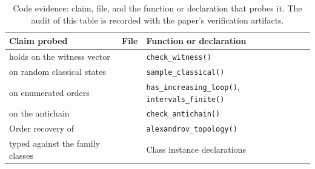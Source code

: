 \documentclass[11pt,letterpaper]{article}
\theoremstyle{definition}
\theoremstyle{remark}
\begin{document}
\begin{table}[t]
\centering
\caption{Code evidence: claim, file, and the function or declaration that probes it. The audit of this table is recorded with the paper's verification artifacts.}
\label{tab:code}
\footnotesize
\begin{tabularx}{\textwidth}{L{0.32\textwidth}L{0.28\textwidth}X}
\toprule
Claim probed & File & Function or declaration \\
\midrule
{} holds on the witness vector &  & \texttt{check\_witness()} \\
 on random classical states &  & \texttt{sample\_classical()} \\
 on enumerated orders &  & \texttt{has\_increasing\_loop()}, \texttt{intervals\_finite()} \\
 on the antichain &  & \texttt{check\_antichain()} \\
Order recovery of  &  & \texttt{alexandrov\_topology()} \\
 typed against the family classes &  & Class instance declarations \\
\bottomrule
\end{tabularx}
\end{table}
\end{document}
